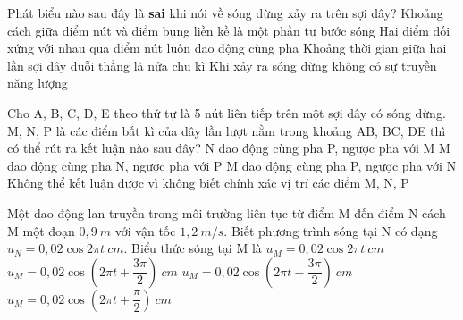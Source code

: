 	\begin{ex}%
		Phát biểu nào sau đây là \textbf{sai} khi nói về sóng dừng xảy ra trên sợi dây?
		\choice
		{Khoảng cách giữa điểm nút và điểm bụng liền kề là một phần tư bước sóng}
		{\True Hai điểm đối xứng với nhau qua điểm nút luôn dao động cùng pha}
		{Khoảng thời gian giữa hai lần sợi dây duỗi thẳng là nửa chu kì}
		{Khi xảy ra sóng dừng không có sự truyền năng lượng}
	\end{ex}
	\begin{ex}%
		Cho A, B, C, D, E theo thứ tự là 5 nút liên tiếp trên một sợi dây có sóng dừng. M, N, P là các điểm bất kì của dây lần lượt nằm trong khoảng AB, BC, DE thì có thể rút ra kết luận nào sau đây?
		\choice
		{\True N dao động cùng pha P, ngược pha với M}
		{M dao động cùng pha N, ngược pha với P}
		{M dao động cùng pha P, ngược pha với N}
		{Không thể kết luận được vì không biết chính xác vị trí các điểm M, N, P}
	\end{ex}
	
	\begin{ex}%
		Một dao động lan truyền trong môi trường liên tục từ điểm M đến điểm N cách M một đoạn $0,9\ m$ với vận tốc $1,2\ m/s$. Biết phương trình sóng tại N có dạng $u_N=0,02\cos2\pi t\ cm$. Biểu thức sóng tại M là
		\choice
		{$u_M =0,02\cos2\pi t\ cm$}
		{\True $u_M=0,02\cos(2\pi t + \dfrac{3\pi}{2})\ cm$}
		{$u_M=0,02\cos(2\pi t - \dfrac{3\pi}{2})\ cm$}
		{$u_M=0,02\cos(2\pi t + \dfrac{\pi}{2})\ cm$}
	\end{ex}
	
